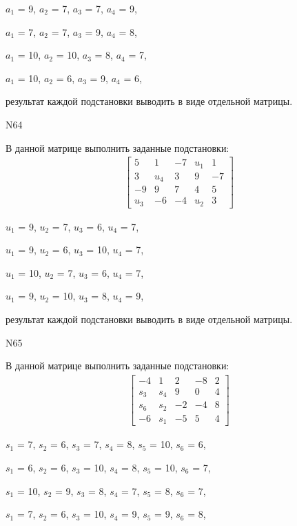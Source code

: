 \documentclass[11pt]{report}
\begin{document}
$a_{1}$ = 9, $a_{2}$ = 7, $a_{3}$ = 7, $a_{4}$ = 9, 

$a_{1}$ = 7, $a_{2}$ = 7, $a_{3}$ = 9, $a_{4}$ = 8, 

$a_{1}$ = 10, $a_{2}$ = 10, $a_{3}$ = 8, $a_{4}$ = 7, 

$a_{1}$ = 10, $a_{2}$ = 6, $a_{3}$ = 9, $a_{4}$ = 6, 

результат каждой подстановки выводить в виде отдельной матрицы.

N64

В данной матрице выполнить заданные подстановки:
\begin{align*}
\left[\begin{matrix}5 & 1 & -7 & u_{1} & 1\\3 & u_{4} & 3 & 9 & -7\\-9 & 9 & 7 & 4 & 5\\u_{3} & -6 & -4 & u_{2} & 3\end{matrix}\right]
\end{align*}


$u_{1}$ = 9, $u_{2}$ = 7, $u_{3}$ = 6, $u_{4}$ = 7, 

$u_{1}$ = 9, $u_{2}$ = 6, $u_{3}$ = 10, $u_{4}$ = 7, 

$u_{1}$ = 10, $u_{2}$ = 7, $u_{3}$ = 6, $u_{4}$ = 7, 

$u_{1}$ = 9, $u_{2}$ = 10, $u_{3}$ = 8, $u_{4}$ = 9, 

результат каждой подстановки выводить в виде отдельной матрицы.

N65

В данной матрице выполнить заданные подстановки:
\begin{align*}
\left[\begin{matrix}-4 & 1 & 2 & -8 & 2\\s_{3} & s_{4} & 9 & 0 & 4\\s_{6} & s_{2} & -2 & -4 & 8\\-6 & s_{1} & -5 & 5 & 4\end{matrix}\right]
\end{align*}


$s_{1}$ = 7, $s_{2}$ = 6, $s_{3}$ = 7, $s_{4}$ = 8, $s_{5}$ = 10, $s_{6}$ = 6, 

$s_{1}$ = 6, $s_{2}$ = 6, $s_{3}$ = 10, $s_{4}$ = 8, $s_{5}$ = 10, $s_{6}$ = 7, 

$s_{1}$ = 10, $s_{2}$ = 9, $s_{3}$ = 8, $s_{4}$ = 7, $s_{5}$ = 8, $s_{6}$ = 7, 

$s_{1}$ = 7, $s_{2}$ = 6, $s_{3}$ = 10, $s_{4}$ = 9, $s_{5}$ = 9, $s_{6}$ = 8, 
\end{document}
